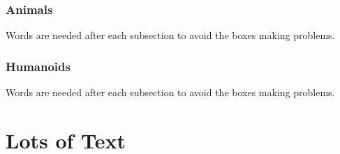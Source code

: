 \documentclass[a4paper,openany]{book}
\begin{document}
\begin{multicols}{2}

\subsection{Animals}
Words are needed after each subsection to avoid the boxes making problems.

\morphhorse

\morphcat

\morphslug

\morphspider

\morphwolf

\subsection{Humanoids}
Words are needed after each subsection to avoid the boxes making problems.



\goblin

\goblincaster

\hobgoblin

\ogre

\end{multicols}


\chapter{Lots of Text}

\begin{multicols}{2}

\noindent
\lipsum

\end{multicols}
\end{document}
